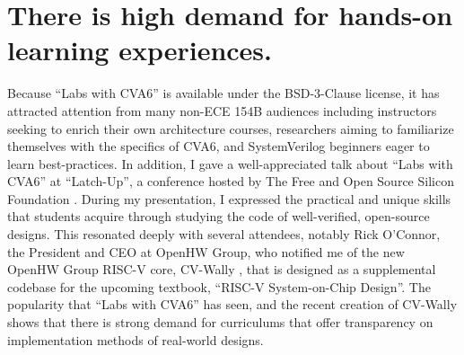 \FloatBarrier

\section{There is high demand for hands-on learning experiences.}

Because \enquote{Labs with CVA6} is available under the BSD-3-Clause license, it has attracted attention from many non-ECE 154B audiences including instructors seeking to enrich their own architecture courses, researchers aiming to familiarize themselves with the specifics of CVA6, and SystemVerilog beginners eager to learn best-practices. In addition, I gave a well-appreciated talk about \enquote{Labs with CVA6} at \enquote{Latch-Up}, a conference hosted by The Free and Open Source Silicon Foundation \cite{SiffermanLatchUp}. During my presentation, I expressed the practical and unique skills that students acquire through studying the code of well-verified, open-source designs. This resonated deeply with several attendees, notably Rick O'Connor, the President and CEO at OpenHW Group, who notified me of the new OpenHW Group RISC-V core, CV-Wally \cite{cvwally}, that is designed as a supplemental codebase for the upcoming textbook, \enquote{RISC-V System-on-Chip Design}. The popularity that \enquote{Labs with CVA6} has seen, and the recent creation of CV-Wally shows that there is strong demand for curriculums that offer transparency on implementation methods of real-world designs.
